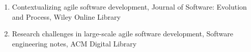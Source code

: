 \begin{enumerate}
	\item{Contextualizing agile software development, Journal of Software: Evolution and Process, Wiley Online Library}
	\item{Research challenges in large-scale agile software development, Software engineering notes, ACM Digital Library}
\end{enumerate}

